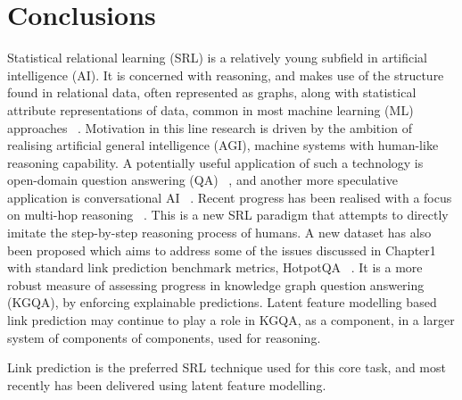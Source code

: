 
\chapter{Conclusions}  %

\ifpdf
    \graphicspath{{Chapter5/Figs/Raster/}{Chapter5/Figs/PDF/}{Chapter5/Figs/}}
\else
    \graphicspath{{Chapter5/Figs/Vector/}{Chapter5/Figs/}}
\fi



Statistical relational learning (SRL) is a relatively young subfield in artificial intelligence (AI). It is concerned with reasoning, and makes use of the structure found in relational data, often represented as graphs, along with statistical attribute representations of data, common in most machine learning (ML) approaches \unskip~\citep{koller2007introduction}. Motivation in this line research is driven by the ambition of realising artificial general intelligence (AGI), machine systems with human-like reasoning capability. A potentially useful application of such a technology is open-domain question answering (QA) \unskip~\citep{chen2017reading}, and another more speculative application is conversational AI \unskip~\citep{moon2019opendialkg, basu2019conversational}. Recent progress has been realised with a focus on multi-hop reasoning \unskip~\citep{asai2019learning, lin2018multi, qi2019answering}. This is a new SRL paradigm that attempts to directly imitate the step-by-step reasoning process of humans. A new dataset has also been proposed which aims to address some of the issues discussed in Chapter1 with standard link prediction benchmark metrics, HotpotQA \unskip~\citep{yang2018hotpotqa}. It is a more robust measure of assessing progress in knowledge graph question answering (KGQA), by enforcing explainable predictions. Latent feature modelling based link prediction may continue to play a role in KGQA, as a component, in a larger system of components of components, used for reasoning. \par   

\noindent Link prediction is the preferred SRL technique used for this core task, and most recently has been delivered using latent feature modelling. \par

